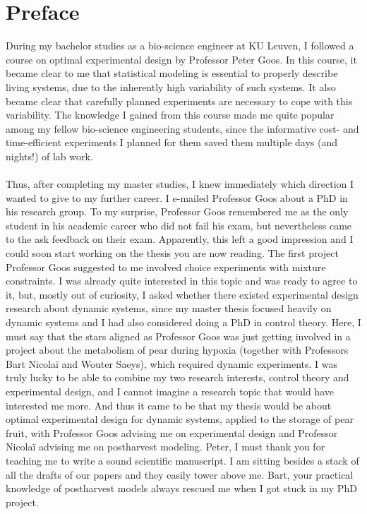 \chapter*{Preface}
During my bachelor studies as a bio-science engineer at KU Leuven, I followed a course on optimal experimental design by Professor Peter Goos. In this course, it became clear to me that statistical modeling is essential to properly describe living systems, due to the inherently high variability of such systems. It also became clear that carefully planned experiments are necessary to cope with this variability. The knowledge I gained from this course made me quite popular among my fellow bio-science engineering students, since the informative cost- and time-efficient experiments I planned for them saved them multiple days (and nights!) of lab work.
\\
\\
Thus, after completing my master studies, I knew immediately which direction I wanted to give to my further career. I e-mailed Professor Goos about a PhD in his research group. To my surprise, Professor Goos remembered me as the only student in his academic career who did not fail his exam, but nevertheless came to the ask feedback on their exam. Apparently, this left a good impression and I could soon start working on the thesis you are now reading. The first project Professor Goos suggested to me involved choice experiments with mixture constraints. I was already quite interested in this topic and was ready to agree to it, but, mostly out of curiosity, I asked whether there existed experimental design research about dynamic systems, since my master thesis focused heavily on dynamic systems and I had also considered doing a PhD in control theory. Here, I must say that the stars aligned as Professor Goos was just getting involved in a project about the metabolism of pear during hypoxia (together with Professors Bart Nicolaï and Wouter Saeys), which required dynamic experiments. I was truly lucky to be able to combine my two research interests, control theory and experimental design, and I cannot imagine a research topic that would have interested me more. And thus it came to be that my thesis would be about optimal experimental design for dynamic systems, applied to the storage of pear fruit, with Professor Goos advising me on experimental design and Professor Nicolaï advising me on postharvest modeling.
Peter, I must thank you for teaching me to write a sound scientific manuscript. I am sitting besides a stack of all the drafts of our papers and they easily tower above me. Bart, your practical knowledge of postharvest models always rescued me when I got stuck in my PhD project.

